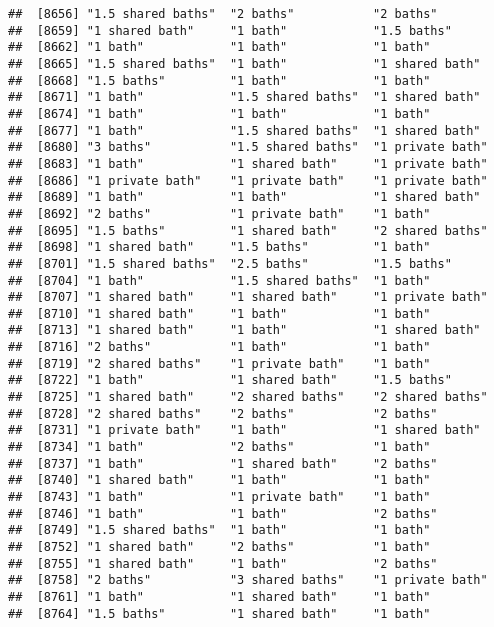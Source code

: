 \documentclass[
]{article}
\begin{document}
\begin{verbatim}
##  [8656] "1.5 shared baths"  "2 baths"           "2 baths"          
##  [8659] "1 shared bath"     "1 bath"            "1.5 baths"        
##  [8662] "1 bath"            "1 bath"            "1 bath"           
##  [8665] "1.5 shared baths"  "1 bath"            "1 shared bath"    
##  [8668] "1.5 baths"         "1 bath"            "1 bath"           
##  [8671] "1 bath"            "1.5 shared baths"  "1 shared bath"    
##  [8674] "1 bath"            "1 bath"            "1 bath"           
##  [8677] "1 bath"            "1.5 shared baths"  "1 shared bath"    
##  [8680] "3 baths"           "1.5 shared baths"  "1 private bath"   
##  [8683] "1 bath"            "1 shared bath"     "1 private bath"   
##  [8686] "1 private bath"    "1 private bath"    "1 private bath"   
##  [8689] "1 bath"            "1 bath"            "1 shared bath"    
##  [8692] "2 baths"           "1 private bath"    "1 bath"           
##  [8695] "1.5 baths"         "1 shared bath"     "2 shared baths"   
##  [8698] "1 shared bath"     "1.5 baths"         "1 bath"           
##  [8701] "1.5 shared baths"  "2.5 baths"         "1.5 baths"        
##  [8704] "1 bath"            "1.5 shared baths"  "1 bath"           
##  [8707] "1 shared bath"     "1 shared bath"     "1 private bath"   
##  [8710] "1 shared bath"     "1 bath"            "1 bath"           
##  [8713] "1 shared bath"     "1 bath"            "1 shared bath"    
##  [8716] "2 baths"           "1 bath"            "1 bath"           
##  [8719] "2 shared baths"    "1 private bath"    "1 bath"           
##  [8722] "1 bath"            "1 shared bath"     "1.5 baths"        
##  [8725] "1 shared bath"     "2 shared baths"    "2 shared baths"   
##  [8728] "2 shared baths"    "2 baths"           "2 baths"          
##  [8731] "1 private bath"    "1 bath"            "1 shared bath"    
##  [8734] "1 bath"            "2 baths"           "1 bath"           
##  [8737] "1 bath"            "1 shared bath"     "2 baths"          
##  [8740] "1 shared bath"     "1 bath"            "1 bath"           
##  [8743] "1 bath"            "1 private bath"    "1 bath"           
##  [8746] "1 bath"            "1 bath"            "2 baths"          
##  [8749] "1.5 shared baths"  "1 bath"            "1 bath"           
##  [8752] "1 shared bath"     "2 baths"           "1 bath"           
##  [8755] "1 shared bath"     "1 bath"            "2 baths"          
##  [8758] "2 baths"           "3 shared baths"    "1 private bath"   
##  [8761] "1 bath"            "1 shared bath"     "1 bath"           
##  [8764] "1.5 baths"         "1 shared bath"     "1 bath"           

\end{verbatim}
\end{document}
